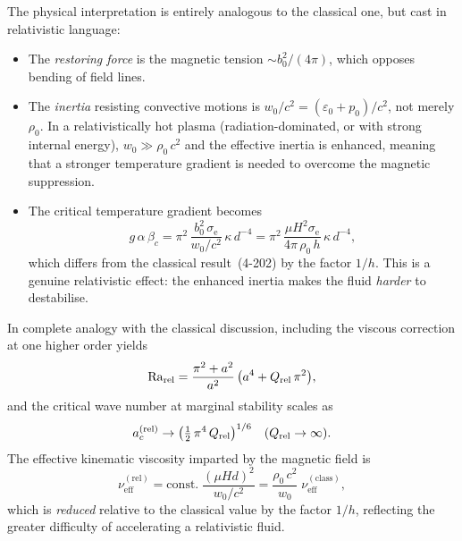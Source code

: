 The physical interpretation is entirely analogous to the classical one,
but cast in relativistic language:
\begin{itemize}
  \item The \emph{restoring force} is the magnetic tension
    $\sim b^{2}_{0}/(4\pi)$, which opposes bending of field lines.
  \item The \emph{inertia} resisting convective motions is
    $w_{0}/c^{2} = (\varepsilon_{0}+p_{0})/c^{2}$, not merely
    $\rho_{0}$.  In a relativistically hot plasma (radiation-dominated,
    or with strong internal energy), $w_{0} \gg \rho_{0}\,c^{2}$ and
    the effective inertia is enhanced, meaning that a stronger
    temperature gradient is needed to overcome the magnetic suppression.
  \item The critical temperature gradient becomes
    \begin{equation}
      g\,\alpha\,\beta_{c}
      = \pi^{2}\,
        \frac{b_{0}^{2}\,\sigma_{\mathrm{e}}}{w_{0}/c^{2}}\,
        \kappa\,d^{-4}
      = \pi^{2}\,
        \frac{\mu H^{2}\sigma_{\mathrm{e}}}{4\pi\,\rho_{0}\,h}\,
        \kappa\,d^{-4} ,
      \label{eq:rel-beta-c-inviscid}
    \end{equation}
    which differs from the classical result~(4-202) by the factor
    $1/h$.  This is a genuine relativistic effect: the enhanced inertia
    makes the fluid \emph{harder} to destabilise.
\end{itemize}

In complete analogy with the classical discussion, including the viscous
correction at one higher order yields
\begin{equation}
  \mathrm{Ra}_{\mathrm{rel}} = \frac{\pi^{2}+a^{2}}{a^{2}}\,
           \bigl(a^{4} + Q_{\mathrm{rel}}\,\pi^{2}\bigr) ,
  \label{eq:rel-higher-order}
\end{equation}
and the critical wave number at marginal stability scales as
\begin{equation}
  a_{c}^{(\mathrm{rel})} \to
  \bigl(\tfrac{1}{2}\,\pi^{4}\,Q_{\mathrm{rel}}\bigr)^{1/6}
  \quad (Q_{\mathrm{rel}}\to\infty) .
  \label{eq:rel-ac-asymptotic}
\end{equation}
The effective kinematic viscosity imparted by the magnetic field is
\begin{equation}
  \nu_{\mathrm{eff}}^{(\mathrm{rel})}
  = \mathrm{const.}\;\frac{(\mu H d)^{2}}{w_{0}/c^{2}}
  = \frac{\rho_{0}\,c^{2}}{w_{0}}\;\nu_{\mathrm{eff}}^{(\mathrm{class})} ,
  \label{eq:rel-nu-eff}
\end{equation}
which is \emph{reduced} relative to the classical value by the factor
$1/h$, reflecting the greater difficulty of accelerating a relativistic
fluid.

